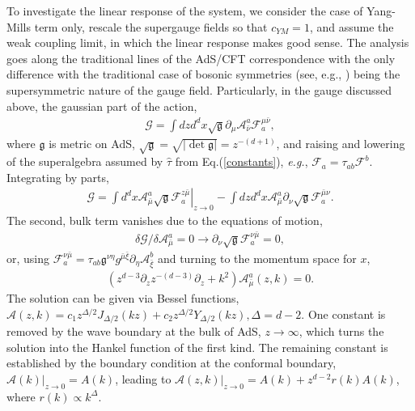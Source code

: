 \documentclass[final,5p,10pt,times,twocolumn,year]{elsarticle}
\begin{document}
To investigate the linear response of the system, we consider the case of Yang-Mills term only, rescale the supergauge fields so that $c_{YM}=1$, and assume the weak coupling limit, in which the linear response makes good sense. The analysis goes along the traditional lines of the AdS/CFT correspondence with the only difference with the traditional case of bosonic symmetries (see, e.g., \cite{GaugeFieldsInAdSCFT}) being the supersymmetric nature of the gauge field. Particularly, in the gauge discussed above, the gaussian part of the action,
\begin{eqnarray}
    \mathcal{G} = \int dz d^{d} x \sqrt{\mathfrak{g}} \partial_{\mu} \mathcal{A}^a_{ \bar \nu} \mathcal{F}_a^{\mu \bar \nu},
\end{eqnarray}
where $\mathfrak{g}$ is metric on AdS, $\sqrt{\mathfrak{g}}=\sqrt{|\det \mathfrak{g}|}=z^{-(d+1)}$, and raising and lowering of the superalgebra assumed by $\hat \tau$ from Eq.(\ref{constants}), \emph{e.g.},  $\mathcal{F}_a = \tau_{ab} \mathcal{F}^{b}$. Integrating by parts,  
\begin{eqnarray}
    \mathcal{G} = \int d^{d} x \left.\mathcal{A}^a_{\bar \mu} \sqrt{\mathfrak{g}} \mathcal{F}_a^{z\bar \mu}\right|_{z\to 0} - \int dz d^{d} x \mathcal{A}^a_{\bar \mu} \partial_{\nu} \sqrt{\mathfrak{g}} \mathcal{F}_a^{\bar \mu \nu}.\label{curlyW_0}
\end{eqnarray}
The second, bulk term vanishes due to the equations of motion,
\begin{eqnarray*}
    \delta \mathcal{G}/ \delta \mathcal{A}^a_{\bar\mu} = 0 \to \partial_{\nu} \sqrt{\mathfrak{g}} \mathcal{F}_a^{\nu \bar\mu} = 0,
\end{eqnarray*}
or, using $\mathcal{F}_a^{\nu \bar\mu} = \tau_{ab}\mathfrak{g}^{\nu\eta}g^{\bar\mu \bar \xi} \partial_{\eta} \mathcal{A}_{\bar\xi}^b$ and turning to the momentum space for $x$,
\begin{eqnarray}
    ( z^{d-3}\partial_{z} z^{-(d-3)} \partial_{z} + k^2 ) \mathcal{A}^a_{\bar \mu}(z,k) = 0.
\end{eqnarray}
The solution can be given via Bessel functions, $\mathcal{A}(z,k)=c_1 z^{\Delta/2} J_{\Delta/2} (k z) +  c_2 z^{\Delta/2} Y_{\Delta/2} (k z), \Delta = d-2$. One constant is removed by the wave boundary at the bulk of AdS, $z\to\infty$, which turns the solution into the Hankel function of the first kind. The remaining constant is established by the boundary condition at the conformal boundary, $\mathcal{A}(k)|_{z\to0} = A(k)$, leading to $\mathcal{A}(z,k)|_{z\to0} = A(k) + z^{d-2} r(k) A(k)$, where $r(k)\propto k^{\Delta}$. 
\end{document}

